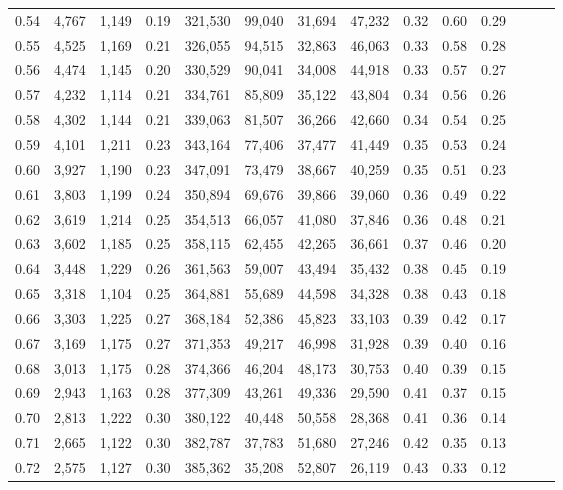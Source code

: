 \begin{tabular}{rrrrrrrrrrrrrr}
0.54 &  4,767 &  1,149 &  0.19 &  321,530 &   99,040 &  31,694 &  47,232 &  0.32 &  0.60 &      0.29 \\
0.55 &  4,525 &  1,169 &  0.21 &  326,055 &   94,515 &  32,863 &  46,063 &  0.33 &  0.58 &      0.28 \\
0.56 &  4,474 &  1,145 &  0.20 &  330,529 &   90,041 &  34,008 &  44,918 &  0.33 &  0.57 &      0.27 \\
0.57 &  4,232 &  1,114 &  0.21 &  334,761 &   85,809 &  35,122 &  43,804 &  0.34 &  0.56 &      0.26 \\
0.58 &  4,302 &  1,144 &  0.21 &  339,063 &   81,507 &  36,266 &  42,660 &  0.34 &  0.54 &      0.25 \\
0.59 &  4,101 &  1,211 &  0.23 &  343,164 &   77,406 &  37,477 &  41,449 &  0.35 &  0.53 &      0.24 \\
0.60 &  3,927 &  1,190 &  0.23 &  347,091 &   73,479 &  38,667 &  40,259 &  0.35 &  0.51 &      0.23 \\
0.61 &  3,803 &  1,199 &  0.24 &  350,894 &   69,676 &  39,866 &  39,060 &  0.36 &  0.49 &      0.22 \\
0.62 &  3,619 &  1,214 &  0.25 &  354,513 &   66,057 &  41,080 &  37,846 &  0.36 &  0.48 &      0.21 \\
0.63 &  3,602 &  1,185 &  0.25 &  358,115 &   62,455 &  42,265 &  36,661 &  0.37 &  0.46 &      0.20 \\
0.64 &  3,448 &  1,229 &  0.26 &  361,563 &   59,007 &  43,494 &  35,432 &  0.38 &  0.45 &      0.19 \\
0.65 &  3,318 &  1,104 &  0.25 &  364,881 &   55,689 &  44,598 &  34,328 &  0.38 &  0.43 &      0.18 \\
0.66 &  3,303 &  1,225 &  0.27 &  368,184 &   52,386 &  45,823 &  33,103 &  0.39 &  0.42 &      0.17 \\
0.67 &  3,169 &  1,175 &  0.27 &  371,353 &   49,217 &  46,998 &  31,928 &  0.39 &  0.40 &      0.16 \\
0.68 &  3,013 &  1,175 &  0.28 &  374,366 &   46,204 &  48,173 &  30,753 &  0.40 &  0.39 &      0.15 \\
0.69 &  2,943 &  1,163 &  0.28 &  377,309 &   43,261 &  49,336 &  29,590 &  0.41 &  0.37 &      0.15 \\
0.70 &  2,813 &  1,222 &  0.30 &  380,122 &   40,448 &  50,558 &  28,368 &  0.41 &  0.36 &      0.14 \\
0.71 &  2,665 &  1,122 &  0.30 &  382,787 &   37,783 &  51,680 &  27,246 &  0.42 &  0.35 &      0.13 \\
0.72 &  2,575 &  1,127 &  0.30 &  385,362 &   35,208 &  52,807 &  26,119 &  0.43 &  0.33 &      0.12 \\

\end{tabular}
